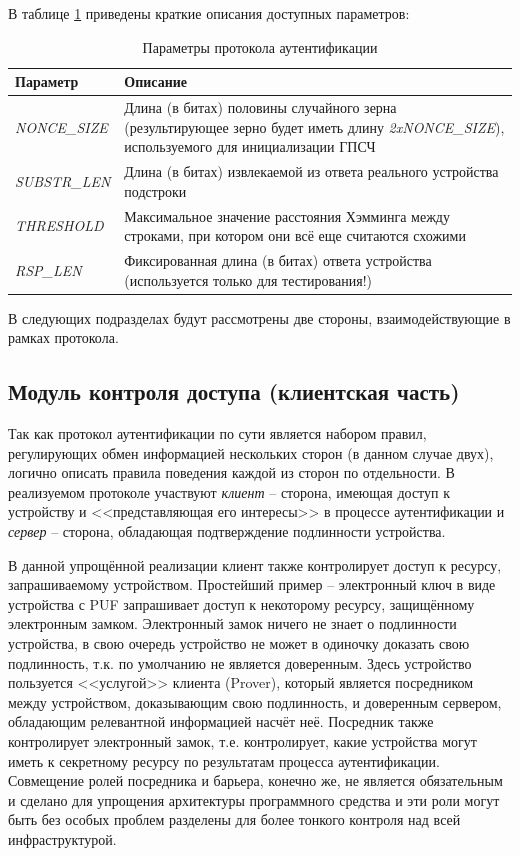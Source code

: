В таблице \ref{table:architecture:cfg_items} приведены краткие описания доступных параметров:

\begin{table}[ht]
  \caption{Параметры протокола аутентификации}
  \label{table:architecture:cfg_items}
  \begin{tabular}{| >{\raggedright}m{}
                  | >{\raggedright\arraybackslash}m{}|}
   \hline
   Параметр & Описание
   \\ \hline
   \textit{NONCE\_SIZE} & Длина (в битах) половины случайного зерна (результирующее зерно будет иметь длину \textit{2xNONCE\_SIZE}), используемого для инициализации ГПСЧ
   \\ \hline
   \textit{SUBSTR\_LEN} & Длина (в битах) извлекаемой из ответа реального устройства подстроки
   \\ \hline
   \textit{THRESHOLD} & Максимальное значение расстояния Хэмминга между строками, при котором они всё еще считаются схожими
   \\ \hline
   \textit{RSP\_LEN} & Фиксированная длина (в битах) ответа устройства (используется только для тестирования!)
   \\ \hline
  \end{tabular}
\end{table}

В следующих подразделах будут рассмотрены две стороны, взаимодействующие в рамках протокола.

\subsection{Модуль контроля доступа (клиентская часть)}
Так как протокол аутентификации по сути является набором правил, регулирующих обмен информацией нескольких сторон (в данном случае двух), логично описать правила поведения каждой из сторон по отдельности. В реализуемом протоколе участвуют \emph{клиент} -- сторона, имеющая доступ к устройству и <<представляющая его интересы>> в процессе аутентификации и \emph{сервер} -- сторона, обладающая подтверждение подлинности устройства.

В данной упрощённой реализации клиент также контролирует доступ к ресурсу, запрашиваемому устройством. Простейший пример -- электронный ключ в виде устройства с PUF запрашивает доступ к некоторому ресурсу, защищённому электронным замком. Электронный замок ничего не знает о подлинности устройства, в свою очередь устройство не может в одиночку доказать свою подлинность, т.к. по умолчанию не является доверенным. Здесь устройство пользуется <<услугой>> клиента (Prover), который является посредником между устройством, доказывающим свою подлинность, и доверенным сервером, обладающим релевантной информацией насчёт неё. Посредник также контролирует электронный замок, т.е. контролирует, какие устройства могут иметь к секретному ресурсу по результатам процесса аутентификации. Совмещение ролей посредника и барьера, конечно же, не является обязательным и сделано для упрощения архитектуры программного средства и эти роли могут быть без особых проблем разделены для более тонкого контроля над всей инфраструктурой.

